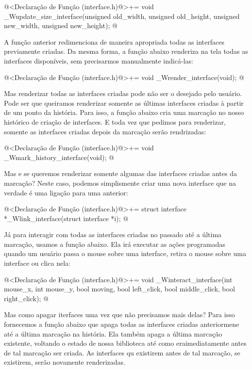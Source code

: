\iniciocodigo
@<Declaração de Função (interface.h)@>+=
void _Wupdate_size_interface(unsigned old_width, unsigned old_height,
                             unsigned new_width, unsigned new_height);
@
\fimcodigo

A função anterior redimenciona de maneira apropriada todas as
interfaces previamente criadas. Da mesma forma, a função abaixo
renderiza na tela todas as interfaces disponíveis, sem precisarmos
manualmente indicá-las:

\iniciocodigo
@<Declaração de Função (interface.h)@>+=
void _Wrender_interface(void);
@
\fimcodigo

Mas renderizar todas as interfaces criadas pode não ser o desejado
pelo usuário. Pode ser que queiramos renderizar somente as últimas
interfaces criadas à partir de um ponto da história.  Para isso, a
função abaixo cria uma marcação no nosso histórico de criação de
interfaces. E toda vez que pedimos para renderizar, somente as
interfaces criadas depois da marcação serão rendrizadas:

\iniciocodigo
@<Declaração de Função (interface.h)@>+=
void _Wmark_history_interface(void);
@
\fimcodigo

Mas e se queremos renderizar somente algumas das interfaces criadas
antes da marcação? Neste caso, podemos simplismente criar uma nova
interface que na verdade é uma ligação para uma anterior:

\iniciocodigo
@<Declaração de Função (interface.h)@>+=
struct interface *_Wlink_interface(struct interface *i);
@
\fimcodigo

Já para interagir com todas as interfaces criadas no passado até a
última marcação, usamos a função abaixo. Ela irá executar as ações
programadas quando um usuário passa o mouse sobre uma interface,
retira o mouse sobre uma interface ou clica nela:

\iniciocodigo
@<Declaração de Função (interface.h)@>+=
void _Winteract_interface(int mouse_x, int mouse_y, bool moving, bool left_click,
                          bool middle_click, bool right_click);
@
\fimcodigo


Mas como apagar iterfaces uma vez que não precisamos mais delas? Para
isso fornecemos a função abaixo que apaga todas as interfaces criadas
anteriormene até a última marcação na história. Ela também apaga a
última marcação existente, voltando o estado de nossa biblioteca até
como eraimediatamente antes de tal marcação ser criada. As interfaces
qu existirem antes de tal marcação, se existirem, serão novamente
renderizadas.

